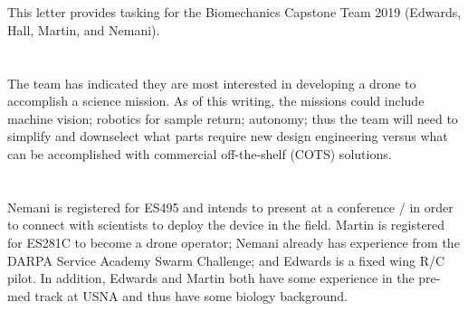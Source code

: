 \documentclass[10pt,courier]{navymemo}
\begin{document}
\navyrecordnotesubjline

\section{}
This letter provides tasking for the Biomechanics Capstone Team 2019 (Edwards, Hall, Martin, and Nemani). 

\section{}
The team has indicated they are most interested in developing a drone to accomplish a science mission. As of this writing, the missions could include machine vision; robotics for sample return; autonomy; thus the team will need to simplify and downselect what parts require new design engineering versus what can be accomplished with commercial off-the-shelf (COTS) solutions. 

\section{} Nemani is registered for ES495 and intends to present at a conference / in order to connect with scientists to deploy the device in the field. Martin is registered for ES281C to become a drone operator; Nemani already has experience from the DARPA Service Academy Swarm Challenge; and Edwards is a fixed wing R/C pilot. In addition, Edwards and Martin both have some experience in the pre-med track at USNA and thus have some biology background.  
\end{document}
